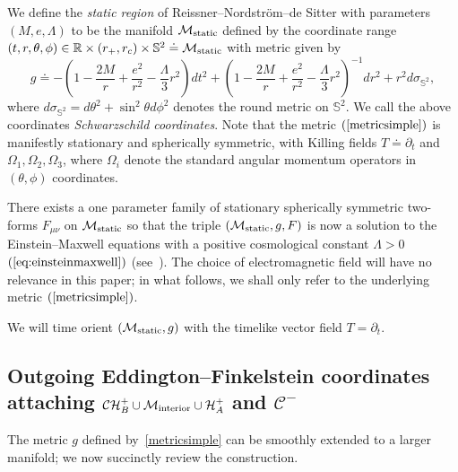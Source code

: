 \documentclass[A4,10pt]{article}
\begin{document}
We define the  \emph{static region} of  
Reissner--Nordstr\"{o}m--de Sitter  with parameters 
 $(M,e,\Lambda)$
 to be the manifold  $\mathcal{M}_{{\rm static}}$ defined  by the coordinate range 
 $(t,r,\theta,\phi) \in \mathbb{R} \times (r_+,r_c) \times \mathbb{S}^2 \doteq \mathcal{M}_{{\rm static}}$ 
 with  metric given by
\begin{equation}\label{metricsimple}
g \doteq -\left(1 - \frac{2M}{r} +\frac{e^2}{r^2} - \frac{\Lambda}{3}r^2\right)dt^2 + \left(1 - \frac{2M}{r} +\frac{e^2}{r^2} - \frac{\Lambda}{3}r^2\right)^{-1}dr^2 + r^2d\sigma_{\mathbb{S}^2},
\end{equation}
where $d\sigma_{\mathbb{S}^2}=d\theta^2+\sin^2\theta d\phi^2$ 
denotes the round metric on $\mathbb{S}^2$.  
We call the above coordinates \emph{Schwarzschild coordinates}.
Note that the metric $(\ref{metricsimple})$ is manifestly stationary and spherically
symmetric, with Killing fields $T\doteq \partial_t$ and $\Omega_1,\Omega_2, \Omega_3$,
where $\Omega_i$ denote the standard angular momentum operators in $(\theta,\phi)$
coordinates.

There exists  a one parameter family
of stationary spherically symmetric two-forms $F_{\mu\nu}$
on $\mathcal{M}_{{\rm static}}$
 so that the triple $(\mathcal{M}_{{\rm static}},g, F)$ is now a solution to the Einstein--Maxwell equations with a positive cosmological constant $\Lambda>0$ $(\ref{eq:einsteinmaxwell})$ (see~\cite{carterreview}).
The choice of electromagnetic field will have no relevance in this paper; 
in what follows, we shall only refer to the underlying metric $(\ref{metricsimple})$.


We will time orient $\left(\mathcal{M}_{{\rm static}},g\right)$ with the timelike vector field $T=\partial_t$. 

\subsection{Outgoing Eddington--Finkelstein coordinates attaching $\mathcal{CH}^+_B\cup\mathcal{M}_{\rm interior}\cup \mathcal{H}^+_A$ and $\mathcal{C}^-$}
\label{outgoingcorfir}

The metric $g$ defined by~\eqref{metricsimple} can be smoothly extended to a larger manifold; we now succinctly review the construction. 
\end{document}
